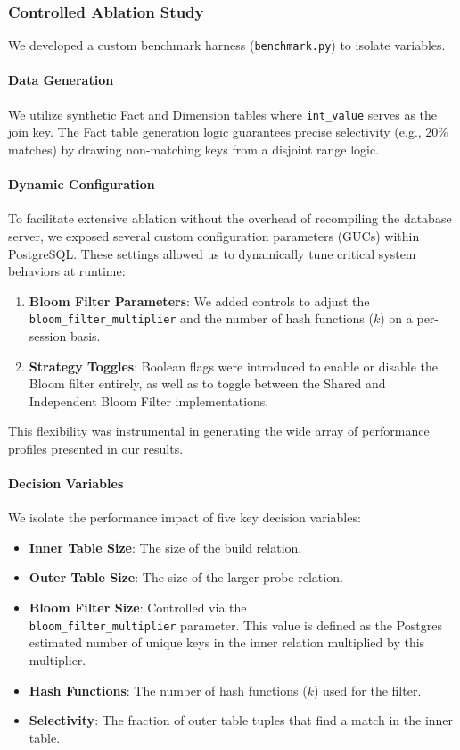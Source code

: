 \documentclass[sigconf,nonacm]{acmart}
\begin{document}
\subsubsection{Controlled Ablation Study}
We developed a custom benchmark harness (\texttt{benchmark.py}) to isolate variables.
\paragraph{Data Generation}
We utilize synthetic Fact and Dimension tables where \texttt{int\_value} serves as the join key. The Fact table generation logic guarantees precise selectivity (e.g., 20\% matches) by drawing non-matching keys from a disjoint range logic.

\paragraph{Dynamic Configuration}
To facilitate extensive ablation without the overhead of recompiling the database server, we exposed several custom configuration parameters (GUCs) within PostgreSQL. These settings allowed us to dynamically tune critical system behaviors at runtime:
\begin{enumerate}
    \item \textbf{Bloom Filter Parameters}: We added controls to adjust the \texttt{bloom\_filter\_multiplier} and the number of hash functions ($k$) on a per-session basis.
    \item \textbf{Strategy Toggles}: Boolean flags were introduced to enable or disable the Bloom filter entirely, as well as to toggle between the Shared and Independent Bloom Filter implementations.
\end{enumerate}
This flexibility was instrumental in generating the wide array of performance profiles presented in our results.

\paragraph{Decision Variables}
We isolate the performance impact of five key decision variables:
\begin{itemize}
    \item \textbf{Inner Table Size}: The size of the build relation.
    \item \textbf{Outer Table Size}: The size of the larger probe relation.
    \item \textbf{Bloom Filter Size}: Controlled via the \\ \texttt{bloom\_filter\_multiplier} parameter. This value is defined as the Postgres estimated number of unique keys in the inner relation multiplied by this multiplier.
    \item \textbf{Hash Functions}: The number of hash functions ($k$) used for the filter.
    \item \textbf{Selectivity}: The fraction of outer table tuples that find a match in the inner table.
\end{itemize}
\end{document}

